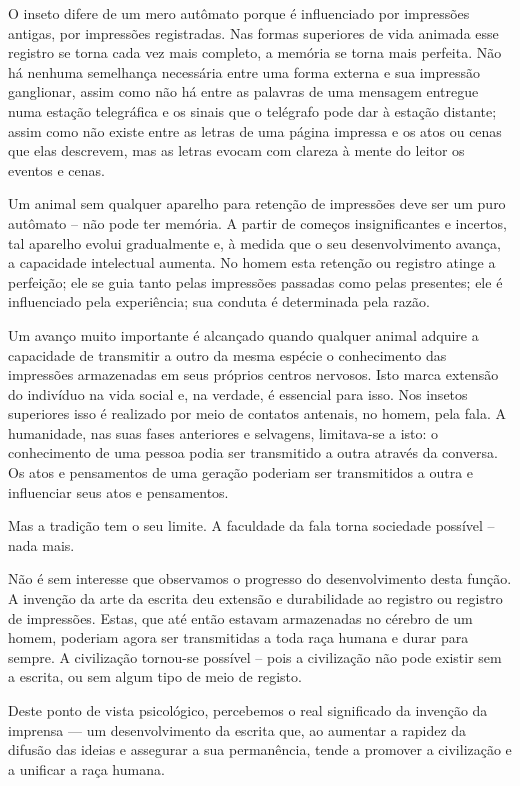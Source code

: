 \documentclass[11pt,a5paper,twoside,openany]{book}
\begin{document}
O inseto difere de um mero autômato porque é influenciado por impressões antigas, por impressões registradas. Nas formas superiores de vida animada esse registro se torna cada vez mais completo, a memória se torna mais perfeita. Não há nenhuma semelhança necessária entre uma forma externa e sua impressão ganglionar, assim como não há entre as palavras de uma mensagem entregue numa estação telegráfica e os sinais que o telégrafo pode dar à estação distante; assim como não existe entre as letras de uma página impressa e os atos ou cenas que elas descrevem, mas as letras evocam com clareza à mente do leitor os eventos e cenas.

Um animal sem qualquer aparelho para retenção de impressões deve ser um puro autômato – não pode ter memória. A partir de começos insignificantes e incertos, tal aparelho evolui gradualmente e, à medida que o seu desenvolvimento avança, a capacidade intelectual aumenta. No homem esta retenção ou registro atinge a perfeição; ele se guia tanto pelas impressões passadas como pelas presentes; ele é influenciado pela experiência; sua conduta é determinada pela razão.

Um avanço muito importante é alcançado quando qualquer animal adquire a capacidade de transmitir a outro da mesma espécie o conhecimento das impressões armazenadas em seus próprios centros nervosos. Isto marca extensão do indivíduo na vida social e, na verdade, é essencial para isso. Nos insetos superiores isso é realizado por meio de contatos antenais, no homem, pela fala. A humanidade, nas suas fases anteriores e selvagens, limitava-se a isto: o conhecimento de uma pessoa podia ser transmitido a outra através da conversa. Os atos e pensamentos de uma geração poderiam ser transmitidos a outra e influenciar seus atos e pensamentos.

Mas a tradição tem o seu limite. A faculdade da fala torna sociedade possível – nada mais.

Não é sem interesse que observamos o progresso do desenvolvimento desta função. A invenção da arte da escrita deu extensão e durabilidade ao registro ou registro de impressões. Estas, que até então estavam armazenadas no cérebro de um homem, poderiam agora ser transmitidas a toda raça humana e durar para sempre. A civilização tornou-se possível – pois a civilização não pode existir sem a escrita, ou sem algum tipo de meio de registo.

Deste ponto de vista psicológico, percebemos o real significado da invenção da imprensa — um desenvolvimento da escrita que, ao aumentar a rapidez da difusão das ideias e assegurar a sua permanência, tende a promover a civilização e a unificar a raça humana.
\end{document}
